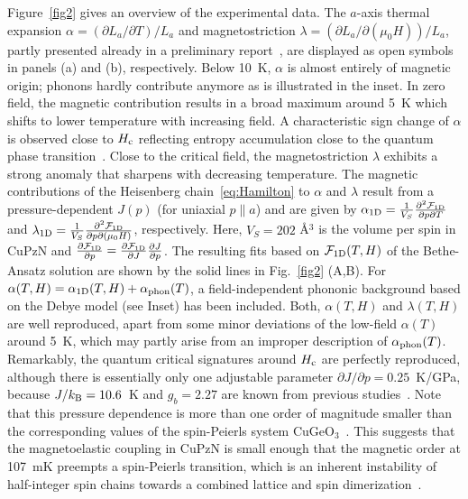 \documentclass[12pt]{article}
\begin{document}
Figure~\ref{fig2} gives an overview of the experimental data. The $a$-axis thermal expansion $\alpha = (\partial L_a/\partial T)/L_a$ and magnetostriction $\lambda = (\partial L_a/\partial (\mu_0 H))/L_a$, partly presented already in a preliminary report~\cite{Rohrkamp2010},  are displayed as open symbols in panels (a) and (b), respectively. Below 10~K, $\alpha$ is almost entirely of magnetic origin; phonons hardly contribute anymore as is illustrated in the inset. In zero field, the magnetic contribution results in a broad maximum around 5~K which shifts to lower temperature with increasing field. A characteristic sign change of $\alpha$ is observed close to $H_{\rm c}$ reflecting entropy accumulation close to the quantum phase transition~\cite{Garst2005}. Close to the critical field, the magnetostriction $\lambda$ exhibits a strong anomaly that sharpens with decreasing temperature. The magnetic contributions of the Heisenberg chain~\eqref{eq:Hamilton} to $\alpha$ and $\lambda$ result from a pressure-dependent $J(p)$ (for uniaxial $p\|a$) and are given by $\alpha_{\rm 1D} = \frac{1}{V_S} \frac{\partial^2 \mathcal{F}_{\rm 1D}}{\partial p \partial T}$ and $\lambda_{\rm 1D} = \frac{1}{V_S}  \frac{\partial^2 \mathcal{F}_{\rm 1D}}{\partial p \partial (\mu_0 H)}$, respectively. Here, $V_S = 202$ \AA$^3$ is the volume per spin in CuPzN and $\frac{\partial \mathcal{F}_{\rm 1D}}{\partial p}=\frac{\partial \mathcal{F}_{\rm 1D}}{\partial J}\frac{\partial J}{\partial p}$.  The resulting fits based on $\mathcal{F}_{\rm 1D}(T,H)$ of the Bethe-Ansatz solution are shown by the solid lines in Fig.~\ref{fig2} (A,B). For $\alpha(T,H) =\alpha_{\rm 1D}(T,H) +\alpha_{\rm phon}(T)$, a field-independent phononic background based on the Debye model (see Inset) has been included. Both, $\alpha(T,H)$ and $\lambda(T,H)$ are well reproduced, apart from some minor deviations of the low-field $\alpha(T)$ around 5~K, which may partly arise from an improper description of $\alpha_{\rm phon}(T)$.  Remarkably, the quantum critical signatures around $H_{\rm c}$ are perfectly reproduced, although there is essentially only one adjustable parameter $\partial J/\partial p = 0.25$~K/GPa, because $J/k_{\rm B} = 10.6$~K and $g_b=2.27$ are known from previous studies~\cite{Hammar1999,McGregor1976}. Note that this pressure dependence is more than one order of magnitude smaller than the corresponding values of the spin-Peierls system CuGeO$_3$~\cite{Buchner1996}. This suggests that the magnetoelastic coupling in CuPzN is small enough that the magnetic order at 107~mK preempts a spin-Peierls transition, which is an inherent instability of half-integer spin chains towards a combined lattice and spin dimerization~\cite{Bray1983,Inagaki1983}.
\end{document}
